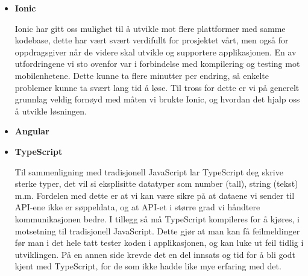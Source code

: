 \begin{itemize}
    \item \textbf{Ionic}
        
        Ionic har gitt oss mulighet til å utvikle mot flere plattformer med samme kodebase, dette har vært svært verdifullt for prosjektet vårt, men også for oppdragsgiver når de videre skal utvikle og supportere applikasjonen. En av utfordringene vi sto ovenfor var i forbindelse med kompilering og testing mot mobilenhetene. Dette kunne ta flere minutter per endring, så enkelte problemer kunne ta svært lang tid å løse. Til tross for dette er vi på generelt grunnlag veldig fornøyd med måten vi brukte Ionic, og hvordan det hjalp oss å utvikle løsningen.
        
    \item \textbf{Angular}
        \newline 
        
    \item \textbf{TypeScript}
        
        Til sammenligning med tradisjonell JavaScript lar TypeScript deg skrive sterke typer, det vil si eksplisitte datatyper som number (tall), string (tekst) m.m. Fordelen med dette er at vi kan være sikre på at dataene vi sender til API-ene ikke er søppeldata, og at API-et i større grad vi håndtere kommunikasjonen bedre. I tillegg så må TypeScript kompileres for å kjøres, i motsetning til tradisjonell JavaScript. Dette gjør at man kan få feilmeldinger før man i det hele tatt tester koden i applikasjonen, og kan luke ut feil tidlig i utviklingen. På en annen side krevde det en del innsats og tid for å bli godt kjent med TypeScript, for de som ikke hadde like mye erfaring med det. 
        

\end{itemize}
